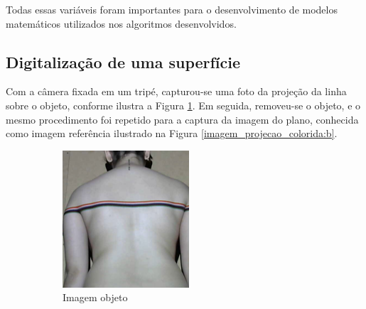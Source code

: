 \documentclass[a4paper, 12pt]{article}
\begin{document}
Todas essas variáveis foram importantes para o desenvolvimento de modelos matemáticos utilizados nos algoritmos desenvolvidos. 

\subsection{Digitalização de uma superfície}

Com a câmera fixada em um tripé, capturou-se uma foto da projeção da linha sobre o objeto, conforme ilustra a Figura \ref{imagem_projecao_colorida:a}. Em seguida, removeu-se o objeto, e o mesmo procedimento foi repetido para a captura da imagem do plano, conhecida como imagem referência ilustrado na Figura \ref{imagem_projecao_colorida:b}. 

\begin{figure}[h!]
	\centering
    \begin{subfigure}{.45\textwidth}
      \centering
      \includegraphics[width=.95\linewidth]{imagem_projecao_colorida_a.png} 
      \caption{Imagem objeto}
      \label{imagem_projecao_colorida:a}
    \end{subfigure}
    \begin{subfigure}{.45\textwidth}
      \centering

\end{subfigure}
\end{figure}
\end{document}
